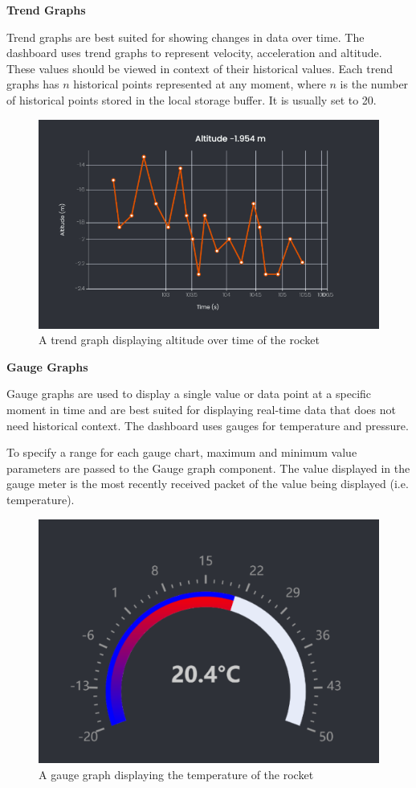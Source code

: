 \textbf{Trend Graphs}

Trend graphs are best suited for showing changes in data over time. The dashboard uses trend graphs
to represent velocity, acceleration and altitude. These values should be viewed in context of their historical values.
Each trend graphs has $n$ historical points represented at any moment, where $n$ is the number of historical points stored
in the local storage buffer. It is usually set to 20.

\begin{figure}[H]
    \includegraphics [scale=1] {ui_trend_graph}
    \centering
     {A trend graph displaying altitude over time of the rocket}
\end{figure}



\textbf{Gauge Graphs}

Gauge graphs are used to display a single value or data point at a specific moment in time and are best suited for
displaying real-time data that does not need historical context. The dashboard uses gauges for temperature and pressure.

To specify a range for each gauge chart, maximum and minimum value parameters are passed to the Gauge graph component.
The value displayed in the gauge meter is the most recently received packet of the value being displayed (i.e. temperature). 


\begin{figure}[H]
    \includegraphics [scale=0.75] {ui_gauge_graph}
    \centering
     {A gauge graph displaying the temperature of the rocket}
\end{figure}

